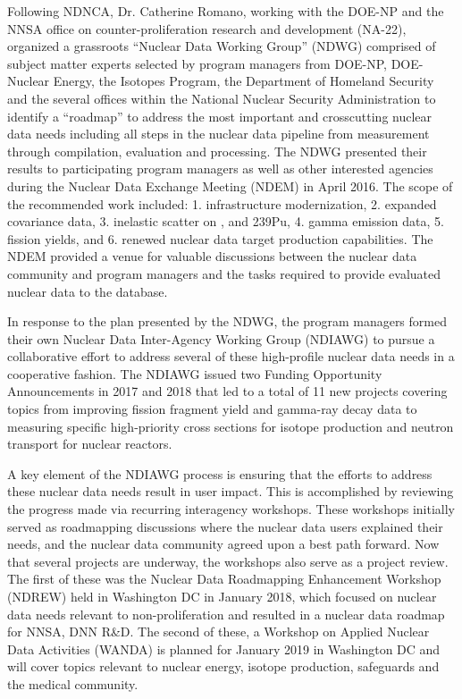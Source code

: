\documentclass[letterpaper,draft]{ar-1col}
\begin{document}
Following NDNCA, Dr. Catherine Romano, working with the DOE-NP and the NNSA office on counter-proliferation research and development (NA-22), organized a grassroots \enquote{Nuclear Data Working Group} (NDWG) comprised of subject matter experts selected by program managers from DOE-NP, DOE-Nuclear Energy, the Isotopes Program, the Department of Homeland Security and the several offices within the National Nuclear Security Administration to identify a \enquote{roadmap} to address the most important and crosscutting nuclear data needs including all steps in the nuclear data pipeline from measurement through compilation, evaluation and processing.  The NDWG presented their results to participating program managers as well as other interested agencies during the Nuclear Data Exchange Meeting (NDEM) in April 2016.  The scope of the recommended work included:
1. infrastructure modernization, 
2. expanded covariance data, 
3. inelastic scatter on ,  and 239Pu, 
4. gamma emission data, 
5. fission yields, and 
6. renewed nuclear data target production capabilities.
The NDEM provided a venue for valuable discussions between the nuclear data community and program managers and the tasks required to provide evaluated nuclear data to the database.  

In response to the plan presented by the NDWG, the program managers formed their own Nuclear Data Inter-Agency Working Group (NDIAWG) to pursue a collaborative effort to address several of these high-profile nuclear data needs in a cooperative fashion.  The NDIAWG issued two Funding Opportunity Announcements in 2017 and 2018 that led to a total of 11 new projects covering topics from improving fission fragment yield and gamma-ray decay data to measuring specific high-priority cross sections for isotope production and neutron transport for nuclear reactors.   

A key element of the NDIAWG process is ensuring that the efforts to address these nuclear data needs result in user impact.  This is accomplished by reviewing the progress made via recurring interagency workshops.  These workshops initially served as roadmapping discussions where the nuclear data users explained their needs, and the nuclear data community agreed upon a best path forward.  Now that several projects are underway, the workshops also serve as a project review. The first of these was the Nuclear Data Roadmapping Enhancement Workshop (NDREW) held in Washington DC in January 2018, which focused on nuclear data needs relevant to non-proliferation \cite{Ndr18} and resulted in a nuclear data roadmap for NNSA, DNN R\&D.  The second of these, a Workshop on Applied Nuclear Data Activities (WANDA) is planned for January 2019 in Washington DC and will cover topics relevant to nuclear energy, isotope production, safeguards and the medical community.  
\end{document}
